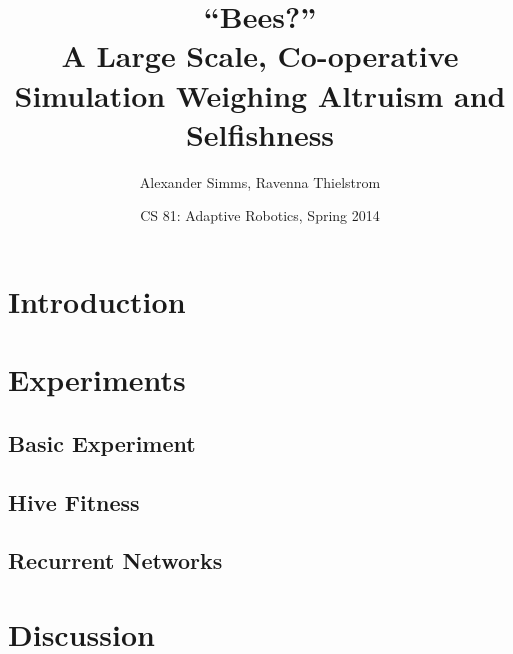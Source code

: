 \documentclass{article}
\title  {``Bees?''\\ A Large Scale, Co-operative Simulation 
         Weighing Altruism and Selfishness}
\author {Alexander Simms, Ravenna Thielstrom}
\date   {CS 81: Adaptive Robotics, Spring 2014}
\begin{document}
	\maketitle

	\begin{abstract}
		\lipsum[1]
	\end{abstract}

	\section{Introduction} %
	\label{sec:introduction}
		\lipsum[3-8]

	\section{Experiments} %
	\label{sec:experiments}
		\subsection{Basic Experiment} %
		\label{sub:basic_experiment}
		\lipsum[8-10]

		\subsection{Hive Fitness} %
		\label{sub:hive_fitness}
		\lipsum[10-12]

		\subsection{Recurrent Networks} %
		\label{sub:recurrent_networks}
		\lipsum[12-14]


	\section{Discussion} %
	\label{sec:discussion}
	\lipsum[14-20]
	\singlespacing
	\appendix
	\pagebreak
\end{document}

